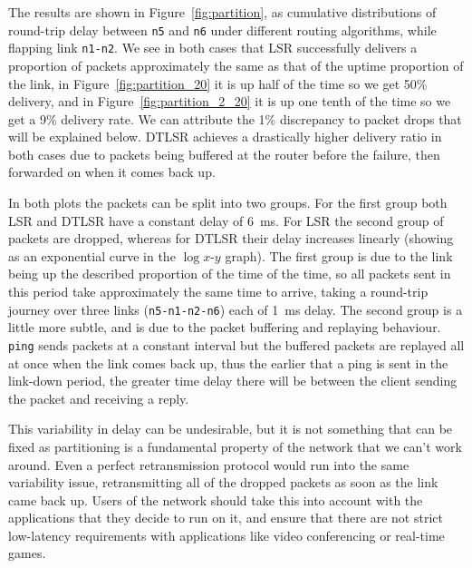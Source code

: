 \documentclass[withindex,glossary,openany]{cam-thesis}
\begin{document}
The results are shown in Figure~\ref{fig:partition}, as cumulative distributions of round-trip delay between \texttt{n5} and \texttt{n6} under different routing algorithms, while flapping link \texttt{n1-n2}. We see in both cases that LSR successfully delivers a proportion of packets approximately the same as that of the uptime proportion of the link, in Figure~\ref{fig:partition_20} it is up half of the time so we get 50\% delivery, and in Figure~\ref{fig:partition_2_20} it is up one tenth of the time so we get a 9\% delivery rate. We can attribute the 1\% discrepancy to packet drops that will be explained below. DTLSR achieves a drastically higher delivery ratio in both cases due to packets being buffered at the router before the failure, then forwarded on when it comes back up.

In both plots the packets can be split into two groups. For the first group both LSR and DTLSR have a constant delay of \SI{6}{\ms}. For LSR the second group of packets are dropped, whereas for DTLSR their delay increases linearly (showing as an exponential curve in the $\log x$-$y$ graph). The first group is due to the link being up the described proportion of the time of the time, so all packets sent in this period take approximately the same time to arrive, taking a round-trip journey over three links (\texttt{n5-n1-n2-n6}) each of \SI{1}{\ms} delay. The second group is a little more subtle, and is due to the packet buffering and replaying behaviour. \texttt{ping} sends packets at a constant interval but the buffered packets are replayed all at once when the link comes back up, thus the earlier that a ping is sent in the link-down period, the greater time delay there will be between the client sending the packet and receiving a reply.

This variability in delay can be undesirable, but it is not something that can be fixed as partitioning is a fundamental property of the network that we can't work around. Even a perfect retransmission protocol would run into the same variability issue, retransmitting all of the dropped packets as soon as the link came back up. Users of the network should take this into account with the applications that they decide to run on it, and ensure that there are not strict low-latency requirements with applications like video conferencing or real-time games.
\end{document}
